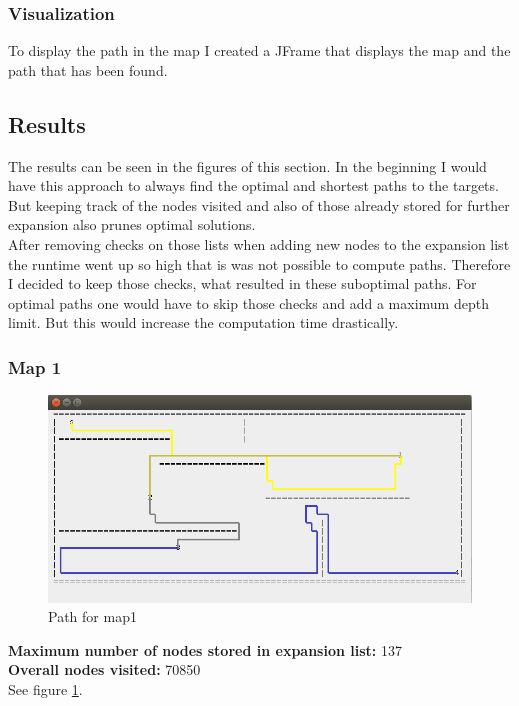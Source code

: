 \documentclass[paper=a4, fontsize=11pt]{scrartcl} %
\numberwithin{equation}{section} %
\numberwithin{figure}{section} %
\numberwithin{table}{section} %
\begin{document}
\subsubsection{Visualization}
To display the path in the map I created a JFrame that displays the map and the path that has been found.

\subsection{Results}
The results can be seen in the figures of this section. In the beginning I would have this approach to always find the optimal and shortest paths to the targets. But keeping track of the nodes visited and also of those already stored for further expansion also prunes optimal solutions.\\
After removing checks on those lists when adding new nodes to the expansion list the runtime went up so high that is was not possible to compute paths. Therefore I decided to keep those checks, what resulted in these suboptimal paths. For optimal paths one would have to skip those checks and add a maximum depth limit. But this would increase the computation time drastically.

\subsubsection{Map 1}
\begin{figure}[Ht]
	\centering
  \includegraphics[width=1\textwidth]{images/map1.png}
	\caption{Path for map1}
	\label{fig:map1}
\end{figure}
\textbf{Maximum number of nodes stored in expansion list:} 137\\
\textbf{Overall nodes visited:} 70850\\
See figure \ref{fig:map1}.
\end{document}
